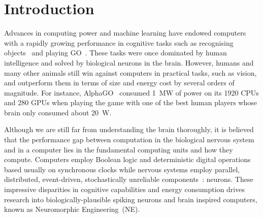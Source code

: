 \chapter{Introduction}
\label{cha:intro}



Advances in computing power and machine learning have endowed computers with a rapidly growing performance in cognitive tasks such as recognising objects~\citep{deng2009imagenet} and playing GO~\citep{silver2016mastering}. 
These tasks were once dominated by human intelligence and solved by biological neurons in the brain.
However, humans and many other animals still win against computers in practical tasks, such as vision, and outperform them in terms of size and energy cost by several orders of magnitude.
For instance, AlphaGO~\citep{silver2016mastering} consumed 1~MW of power on its 1920 CPUs and 280 GPUs when playing the game with one of the best human players whose brain only consumed about 20~W.

Although we are still far from understanding the brain thoroughly, it is believed that the performance gap between computation in the biological nervous system and in a computer lies in the fundamental computing units and how they compute.
Computers employ Boolean logic and deterministic digital operations based usually on synchronous clocks while nervous systems employ parallel, distributed, event-driven, stochastically unreliable components~\citep{indiveri2009artificial}: neurons.
These impressive disparities in cognitive capabilities and energy consumption drives research into biologically-plausible spiking neurons and brain inspired computers, known as Neuromorphic Engineering~(NE).




